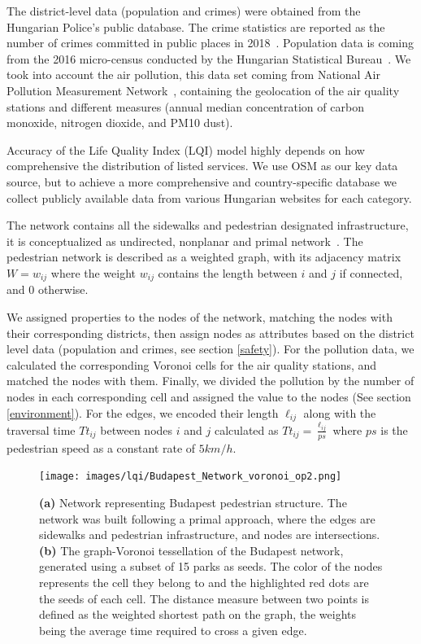 The district-level data (population and crimes) were obtained from the Hungarian Police's public database. The crime statistics are reported as the  number of crimes committed in public places in 2018~\cite{HU2019Police}. Population data is coming from the 2016 micro-census conducted by the Hungarian Statistical Bureau~\cite{HU2016Population}. We took into account the air pollution, this data set coming from National Air Pollution Measurement Network~\cite{HU2019Pollution}, containing the geolocation of the air quality stations and different measures (annual median concentration of carbon monoxide, nitrogen dioxide, and PM10 dust).

Accuracy of the Life Quality Index (LQI) model highly depends on how comprehensive the distribution of listed services. We use OSM as our key data source, but to achieve a more comprehensive and country-specific database we collect publicly available data from various Hungarian websites for each category. %

The network contains all the sidewalks and pedestrian designated infrastructure, it is conceptualized as undirected, nonplanar and primal network~\cite{porta2006primal}. The pedestrian network is described as a weighted graph, with its adjacency matrix $W=w_{ij}$ where the weight $w_{ij}$ contains the length between $i$ and $j$ if connected, and $0$ otherwise.

We assigned properties to the nodes of the network, matching the nodes with their corresponding districts, then assign nodes as attributes based on the district level data (population and crimes, see section \ref{safety}). For the pollution data, we calculated the corresponding Voronoi cells for the air quality stations, and matched the nodes with them. Finally, we divided the pollution by the number of nodes in each corresponding cell and assigned the value to the nodes (See section \ref{environment}). For the edges, we encoded their length $\ell_{ij}$ along with the traversal time $Tt_{ij}$ between nodes $i$ and $j$ calculated as $Tt_{ij}=\frac{\ell_{ij}}{ps}$ where $ps$ is the pedestrian speed as a constant rate of $5km/h$.

\begin{figure}[ht!]
	\centering
	\texttt{[image: images/lqi/Budapest\_Network\_voronoi\_op2.png]}
	\caption[Budapest pedestrian network]{\textbf{(a)} Network representing Budapest pedestrian structure. The network was built following a primal approach, where the edges are sidewalks and pedestrian infrastructure, and nodes are intersections. \textbf{(b)} The graph-Voronoi tessellation of the Budapest network, generated using a subset of 15 parks as seeds. The color of the nodes represents the cell they belong to and the highlighted red dots are the seeds of each cell. The distance measure between two points is defined as the weighted shortest path on the graph, the weights being the average time required to cross a given edge.}
	\label{fig:BPnetwork}
\end{figure}

